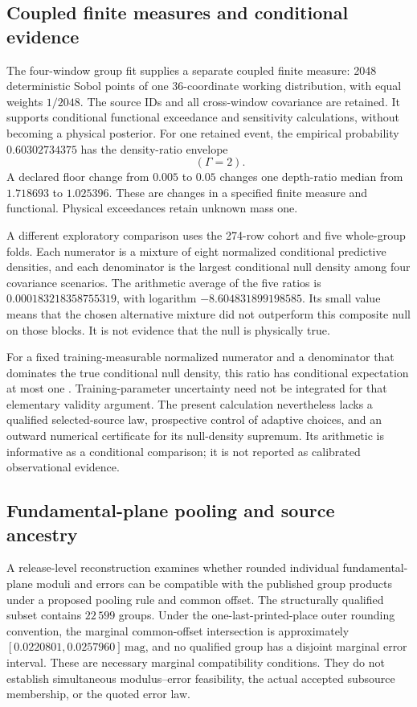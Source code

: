 \subsection{Coupled finite measures and conditional evidence}

The four-window group fit supplies a separate coupled finite measure: 2048 deterministic Sobol points of one 36-coordinate working distribution, with equal weights $1/2048$. The source IDs and all cross-window covariance are retained. It supports conditional functional exceedance and sensitivity calculations, without becoming a physical posterior. For one retained event, the empirical probability $0.60302734375$ has the density-ratio envelope\begin{equation}[0.301513671875,\;0.801513671875]\qquad(\Gamma=2).\end{equation} A declared floor change from $0.005$ to $0.05$ changes one depth-ratio median from $1.718693$ to $1.025396$. These are changes in a specified finite measure and functional. Physical exceedances retain unknown mass one.

A different exploratory comparison uses the 274-row cohort and five whole-group folds. Each numerator is a mixture of eight normalized conditional predictive densities, and each denominator is the largest conditional null density among four covariance scenarios. The arithmetic average of the five ratios is $0.000183218358755319$, with logarithm $-8.604831899198585$. Its small value means that the chosen alternative mixture did not outperform this composite null on those blocks. It is not evidence that the null is physically true.

For a fixed training-measurable normalized numerator and a denominator that dominates the true conditional null density, this ratio has conditional expectation at most one \cite{Wasserman2020}. Training-parameter uncertainty need not be integrated for that elementary validity argument. The present calculation nevertheless lacks a qualified selected-source law, prospective control of adaptive choices, and an outward numerical certificate for its null-density supremum. Its arithmetic is informative as a conditional comparison; it is not reported as calibrated observational evidence.

\subsection{Fundamental-plane pooling and source ancestry}

A release-level reconstruction examines whether rounded individual fundamental-plane moduli and errors can be compatible with the published group products under a proposed pooling rule and common offset. The structurally qualified subset contains $22\,599$ groups. Under the one-last-printed-place outer rounding convention, the marginal common-offset intersection is approximately $[0.0220801,0.0257960]\,\mathrm{mag}$, and no qualified group has a disjoint marginal error interval. These are necessary marginal compatibility conditions. They do not establish simultaneous modulus--error feasibility, the actual accepted subsource membership, or the quoted error law.

